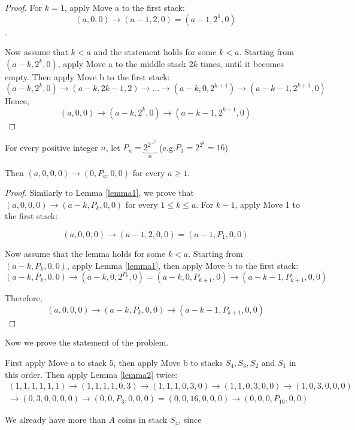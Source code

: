 \begin{problem}
\begin{proof}
For $k=1$, apply Move a to the ﬁrst stack: $$(a,0,0)\rightarrow (a-1,2,0) = (a-1,2^1,0)$$. 

Now assume that $k < a$ and the statement holds for some $k<a$. Starting from $(a-k,2^k,0)$, apply Move a to the middle stack $2k$ times, until it becomes empty. Then apply Move b to the ﬁrst stack: $$(a-k,2^k,0)  \rightarrow (a-k,2k-1,2)  \rightarrow \dots   \rightarrow (a-k,0,2^{k+1})  \rightarrow (a-k-1,2^{k+1},0)$$
Hence, $$(a,0,0)  \rightarrow (a-k,2^k,0)  \rightarrow (a-k-1,2^{k+1},0)$$
\end{proof}

\begin{lemma}
\label{lemma2}
\label{lemma2}
 For every positive integer $n$, let $P_n=\underbrace{2^{2^{{\dots}^{2}}}}_n$ (e.g.$ P_3=2^{2^2}=16$) 
 
Then $(a,0,0,0) \rightarrow (0,P_a,0,0)$ for every $a \ge1$.
\end{lemma}
\begin{proof}
Similarly to Lemma \ref{lemma1}, we prove that $(a,0,0,0) \rightarrow (a-k,P_k,0,0)$ for every $1 \le k \le a$. For $k-1$, apply Move 1 to the ﬁrst stack: 

$$(a,0,0,0) \rightarrow (a-1,2,0,0)=(a-1,P_1,0,0)$$

Now assume that the lemma holds for some $k < a$. Starting from $(a-k,P_k,0,0)$, apply Lemma \ref{lemma1}, then apply Move b to the ﬁrst stack: 
$$ (a-k,P_k,0,0) \rightarrow (a-k,0,2^{P_k},0)=(a-k,0,P_{k+1},0) \rightarrow (a-k-1,P_{k+1},0,0)$$

Therefore, $$(a,0,0,0) \rightarrow (a-k,P_k,0,0) \rightarrow (a-k-1,P_{k+1},0,0)$$

\end{proof}

Now we prove the statement of the problem. 

First apply Move a to stack $5$, then apply Move b to stacks $S_4, S_3, S_2$ and $S_1$ in this order. Then apply  Lemma \ref{lemma2} twice:
\begin{equation}
\begin{split}
 (1,1,1,1,1,1) \rightarrow (1,1,1,1,0,3) \rightarrow (1,1,1,0,3,0) \rightarrow (1,1,0,3,0,0) \rightarrow (1,0,3,0,0,0) \\
  \rightarrow (0,3,0,0,0,0) \rightarrow (0,0,P_3,0,0,0) = (0,0,16,0,0,0) \rightarrow (0,0,0,P_{16},0,0)
\end{split}
\end{equation}

We already have more than $A$ coins in stack $S_4$, since 


\end{problem}
